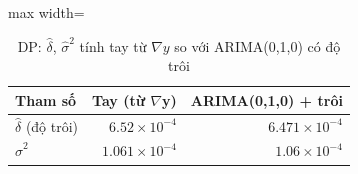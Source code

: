 \begin{table}[H]
\centering\small
\caption{DP: $\hat\delta$, $\hat\sigma^2$ tính tay từ $\nabla y$ so với ARIMA(0,1,0) có độ trôi}\label{tab:tab_b12_05_rw_manual_vs_arima}
\begin{adjustbox}{max width=\linewidth}
\begin{tabular}{lrr}
\toprule
Tham số & Tay (từ $\nabla$y) & ARIMA(0,1,0) + trôi \\
\midrule
$\hat{\delta}$ (độ trôi) & $6.52\times10^{-4}$ & $6.471\times10^{-4}$ \\
$\hat{\sigma}^{2}$ & $1.061\times10^{-4}$ & $1.06\times10^{-4}$ \\
\bottomrule
\end{tabular}
\end{adjustbox}
\end{table}
